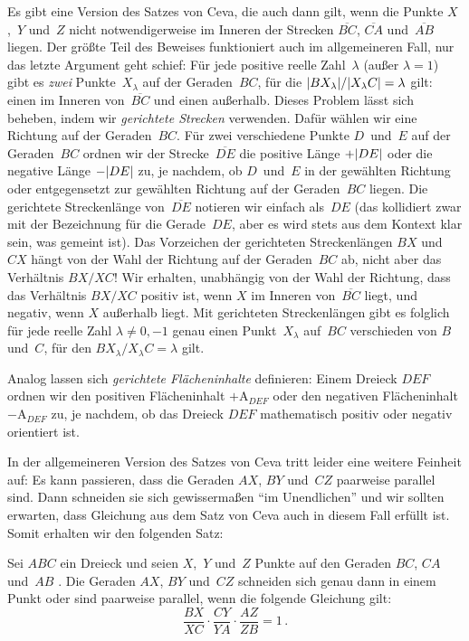 Es gibt eine Version des Satzes von Ceva, die auch dann gilt, wenn die Punkte $X$,~$Y$ und~$Z$ nicht notwendigerweise im Inneren der Strecken $\overline{BC}$, $\overline{CA}$ und~$\overline{AB}$ liegen. Der größte Teil des Beweises funktioniert auch im allgemeineren Fall, nur das letzte Argument geht schief: Für jede positive reelle Zahl~$\lambda$ (außer $\lambda=1$) gibt es \emph{zwei} Punkte~$X_\lambda$ auf der Geraden~$BC$, für die $\lvert BX_\lambda\rvert/\lvert X_\lambda C\rvert=\lambda$ gilt: einen im Inneren von~$\overline{BC}$ und einen außerhalb. Dieses Problem lässt sich beheben, indem wir \emph{gerichtete Strecken} verwenden. Dafür wählen wir eine Richtung auf der Geraden~$BC$. Für zwei verschiedene Punkte $D$~und~$E$ auf der Geraden~$BC$ ordnen wir der Strecke~$\overline{DE}$ die positive Länge $+\lvert DE\rvert$ oder die negative Länge $-\lvert DE\rvert$ zu, je nachdem, ob $D$~und~$E$ in der gewählten Richtung oder entgegensetzt zur gewählten Richtung auf der Geraden~$BC$ liegen. Die gerichtete Streckenlänge von~$\overline{DE}$ notieren wir einfach als~$DE$ (das kollidiert zwar mit der Bezeichnung für die Gerade~$DE$, aber es wird stets aus dem Kontext klar sein, was gemeint ist). Das Vorzeichen der gerichteten Streckenlängen $BX$ und~$CX$ hängt von der Wahl der Richtung auf der Geraden~$BC$ ab, nicht aber das Verhältnis $BX/XC$! Wir erhalten, unabhängig von der Wahl der Richtung, dass das Verhältnis $BX/XC$ positiv ist, wenn $X$ im Inneren von~$\overline{BC}$ liegt, und negativ, wenn $X$ außerhalb liegt. Mit gerichteten Streckenlängen gibt es folglich für jede reelle Zahl $\lambda\neq 0,-1$ genau einen Punkt~$X_\lambda$ auf~$BC$ verschieden von $B$ und~$C$, für den $BX_\lambda/X_\lambda C=\lambda$ gilt.

Analog lassen sich \emph{gerichtete Flächeninhalte} definieren: Einem Dreieck $DEF$ ordnen wir den positiven Flächeninhalt $+\mathrm{A}_{DEF}$ oder den negativen Flächeninhalt $-\mathrm{A}_{DEF}$ zu, je nachdem, ob das Dreieck $DEF$ mathematisch positiv oder negativ orientiert ist.

In der allgemeineren Version des Satzes von Ceva tritt leider eine weitere Feinheit auf:
Es kann passieren, dass die Geraden $AX$, $BY$ und~$CZ$ paarweise parallel sind. Dann schneiden sie sich gewissermaßen \enquote{im Unendlichen} und wir sollten erwarten, dass Gleichung aus dem Satz von Ceva auch in diesem Fall erfüllt ist. Somit erhalten wir den folgenden Satz:

\begin{satzmitnamen}
	Sei $ABC$ ein Dreieck und seien $X$,~$Y$ und~$Z$ Punkte auf den Geraden $BC$, $CA$ und~$AB$ . Die Geraden $AX$, $BY$ und~$CZ$ schneiden sich genau dann in einem Punkt oder sind paarweise parallel, wenn die folgende Gleichung  gilt:
	\begin{equation*}%
		\frac{BX}{XC}\cdot \frac{CY}{YA}\cdot \frac{AZ}{ZB}=1\,.
	\end{equation*}
\end{satzmitnamen}

